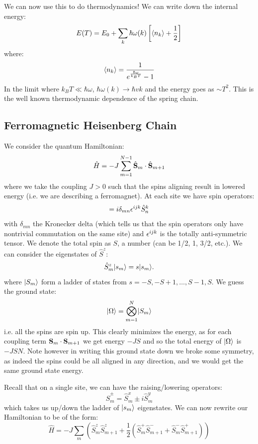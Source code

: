 We can now use this to do thermodynamics! We can write down the internal energy:
\begin{equation}
    E(T) = E_0 + \sum_k \hbar \omega(k)\left[\left< n_k \right> + \frac{1}{2}\right]
\end{equation}
where:
\begin{equation}
    \left< n_k \right> = \frac{1}{e^{\frac{\hbar\omega}{k_BT}} - 1}
\end{equation}
In the limit where $k_B T \ll \hbar\omega$, $\hbar\omega(k) \to \hbar v k$ and the energy goes as $\sim T^2$. This is the well known thermodynamic dependence of the spring chain.

\subsection{Ferromagnetic Heisenberg Chain}
We consider the quantum Hamiltonian:
\begin{equation}
    \hat{H} = -J\sum_{m=1}^{N-1} \hat{\mathbf{S}}_m \cdot \hat{\mathbf{S}}_{m+1}
\end{equation}
where we take the coupling $J > 0$ such that the spins aligning result in lowered energy (i.e. we are describing a ferromagnet). At each site we have spin operators:
\begin{equation}
    [\hat{S}^i_m, \hat{S}^j_n] = i\delta_{mn}\e^{ijk}\hat{S}^k_n
\end{equation}
with $\delta_{mn}$ the Kronecker delta (which tells us that the spin operators only have nontrivial commutation on the same site) and $\epsilon^{ijk}$ is the totally anti-symmetric tensor. We denote the total spin as $S$, a number (can be 1/2, 1, 3/2, etc.). We can consider the eigenstates of $\hat{S}^z$:
\begin{equation}
    \hat{S}^z_m\lvert s_m \rangle = s\lvert s_m \rangle.
\end{equation}
where $\lvert S_m \rangle$ form a ladder of states from $s = -S, -S+1, \ldots, S-1, S$. We guess the ground state:
\begin{equation}
    \lvert \Omega \rangle = \bigotimes_{m=1}^N \lvert S_m \rangle
\end{equation}
i.e. all the spins are spin up. This clearly minimizes the energy, as for each coupling term $\mathbf{S}_m \cdot \mathbf{S}_{m+1}$ we get energy $-JS$ and so the total energy of $\lvert \Omega \rangle$ is $-JSN$. Note however in writing this ground state down we broke some symmetry, as indeed the spins could be all aligned in any direction, and we would get the same ground state energy.

Recall that on a single site, we can have the raising/lowering operators:
\begin{equation}
    \hat{S}^\pm_m = \hat{S}^x_m \pm i \hat{S}^y_m
\end{equation}
which takes us up/down the ladder of $\lvert s_m \rangle$ eigenstates. We can now rewrite our Hamiltonian to be of the form:
\begin{equation}
    \hat{H} = -J\sum_m \left(\hat{S}^z_m\hat{S}^z_{m+1} + \frac{1}{2}\left(\hat{S}^+_m\hat{S}^-_{m+1} + \hat{S}^-_m\hat{S}^+_{m+1}\right)\right)
\end{equation}

